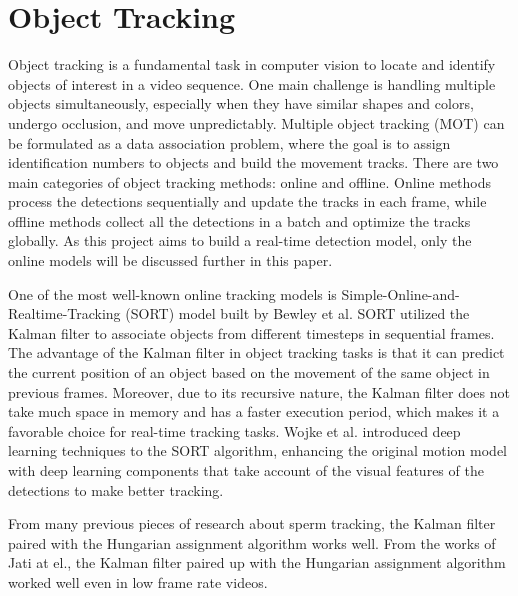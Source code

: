 \section{Object Tracking}
Object tracking is a fundamental task in computer vision to locate and identify objects of interest in a video sequence. One main challenge is handling multiple objects simultaneously, especially when they have similar shapes and colors, undergo occlusion, and move unpredictably. Multiple object tracking (MOT) can be formulated as a data association problem, where the goal is to assign identification numbers to objects and build the movement tracks. There are two main categories of object tracking methods: online and offline. Online methods process the detections sequentially and update the tracks in each frame, while offline methods collect all the detections in a batch and optimize the tracks globally. As this project aims to build a real-time detection model, only the online models will be discussed further in this paper.

One of the most well-known online tracking models is Simple-Online-and-Realtime-Tracking (SORT) model built by Bewley et al. \cite{SORT} SORT utilized the Kalman filter to associate objects from different timesteps in sequential frames. The advantage of the Kalman filter in object tracking tasks is that it can predict the current position of an object based on the movement of the same object in previous frames. Moreover, due to its recursive nature, the Kalman filter does not take much space in memory and has a faster execution period, which makes it a favorable choice for real-time tracking tasks. Wojke et al. introduced deep learning techniques to the SORT algorithm, enhancing the original motion model with deep learning components that take account of the visual features of the detections to make better tracking. \cite{DeepSORT}

From many previous pieces of research about sperm tracking, the Kalman filter paired with the Hungarian assignment algorithm works well. From the works of Jati at el., the Kalman filter paired up with the Hungarian assignment algorithm worked well even in low frame rate videos. \cite{KalmanHungarian}